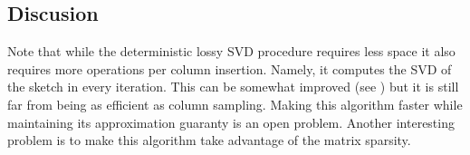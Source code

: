\subsection*{Discusion}
Note that while the deterministic lossy SVD procedure requires less space it also requires more operations per column insertion.
Namely, it computes the SVD of the sketch in every iteration. 
This can be somewhat improved (see \cite{LibertyMatrixSketching2012}) but it is still far from being as efficient as column sampling.
Making this algorithm faster while maintaining its approximation guaranty is an open problem.
Another interesting problem is to make this algorithm take advantage of the matrix sparsity.





















